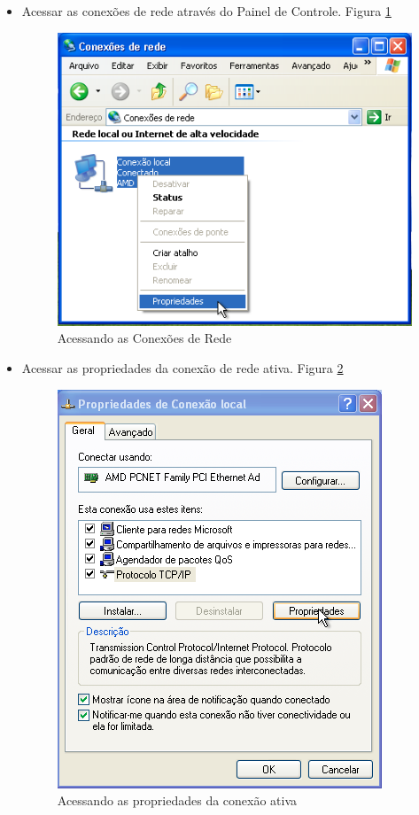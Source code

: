\begin{itemize}
	\item Acessar as conexões de rede através do Painel de Controle. Figura \ref{conexoes_rede}
	\begin{figure}[ht]
			\centering
	 		\includegraphics[width=0.7 \textwidth]{figuras/conexoes_rede}
			\caption{Acessando as Conexões de Rede}
			\label{conexoes_rede}
	\end{figure}	
	\item Acessar as propriedades da conexão de rede ativa. Figura \ref{propriedades_conexao}
	\begin{figure}[h!]
			\centering
	 		\includegraphics[width=0.7 \textwidth]{figuras/propriedades_conexao}
			\caption{Acessando as propriedades da conexão ativa}
			\label{propriedades_conexao}
	\end{figure}
	

\end{itemize}
